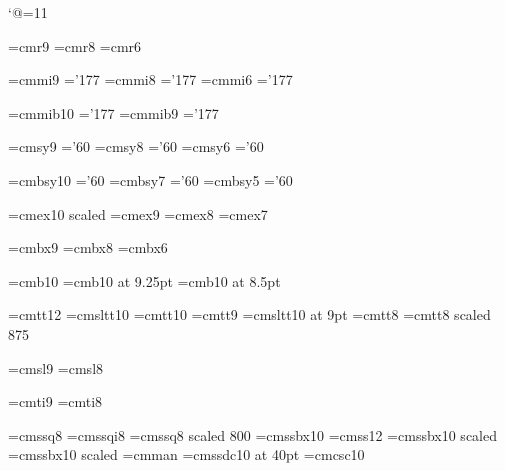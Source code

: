 

\beginpackages
  \usepackage{graphicx}
  \usepackage[dvipsnames]{color}
\endpackages
\enablehyperlinks
{}



\catcode`@=11 %

\long\def\verbatim#1{\def\next{#1}%
  {\tt\frenchspacing\expandafter\strip\meaning\next}}
\def\strip#1>{}


\def\url#1{\hlstart{url}{}{#1}\verbatim{#1}\hlend}

\font\ninerm=cmr9
\font\eightrm=cmr8
\font\sixrm=cmr6

\font\ninei=cmmi9  \skewchar\ninei='177
\font\eighti=cmmi8  \skewchar\eighti='177
\font\sixi=cmmi6  \skewchar\sixi='177

\font\tenbi=cmmib10  \skewchar\tenbi='177
\font\ninebi=cmmib9  \skewchar\ninebi='177

\font\ninesy=cmsy9  \skewchar\ninesy='60
\font\eightsy=cmsy8  \skewchar\eightsy='60
\font\sixsy=cmsy6  \skewchar\sixsy='60

\font\tenbsy=cmbsy10  \skewchar\tenbsy='60
\font\sevenbsy=cmbsy7  \skewchar\sevenbsy='60
\font\fivebsy=cmbsy5  \skewchar\fivebsy='60

\font\elevenex=cmex10 scaled\magstephalf
\font\nineex=cmex9
\font\eightex=cmex8
\font\sevenex=cmex7

\font\ninebf=cmbx9
\font\eightbf=cmbx8
\font\sixbf=cmbx6

\font\tenthinbf=cmb10
\font\ninethinbf=cmb10 at 9.25pt
\font\eightthinbf=cmb10 at 8.5pt

\font\twelvett=cmtt12  \hyphenchar{}  %
\font\tensltt=cmsltt10  \hyphenchar{}
\font\eleventt=cmtt10  \hyphenchar{}
\font\ninett=cmtt9  \hyphenchar{}
\font\ninesltt=cmsltt10 at 9pt  \hyphenchar{}
\font\eighttt=cmtt8  \hyphenchar{}
\font\seventt=cmtt8 scaled 875  \hyphenchar{}

\font\ninesl=cmsl9
\font\eightsl=cmsl8

\font\nineit=cmti9
\font\eightit=cmti8

\font\eightss=cmssq8
\font\eightssi=cmssqi8
\font\sixss=cmssq8 scaled 800
\font\tenssbx=cmssbx10
\font\twelvess=cmss12
\font\titlefont=cmssbx10 scaled
\font\chapterfont=cmssbx10 scaled
\font\cmman=cmman %
\font\inchhigh=cmssdc10 at 40pt
\font\tencsc=cmcsc10


